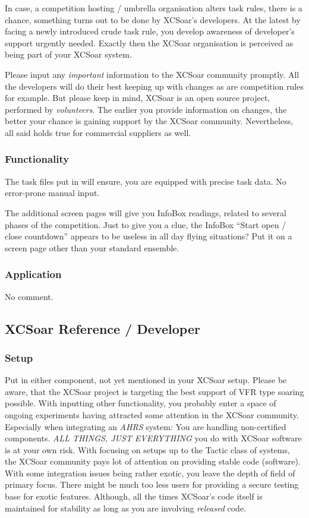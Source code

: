 In case, a competition hosting / umbrella organisation alters task rules, there 
is a chance, something turns out to be done by XCSoar's developers. At the latest 
by facing a newly introduced crude task rule, you develop awareness of 
developer's support urgently needed. Exactly then the XCSoar organisation is 
perceived as being part of your XCSoar system.

Please input any \emph{important} information to the XCSoar community promptly. 
All the developers will do their best keeping up with changes as are competition 
rules for example. But please keep in mind, XCSoar is an open source project, 
performed by \emph{volunteers}. The earlier you provide information on changes, 
the better your chance is gaining support by the XCSoar community. Nevertheless, 
all said holds true for commercial suppliers as well.  

\subsubsection*{Functionality} The task files put in will ensure, you are 
equipped with precise task data. No error-prone manual input.

The additional screen pages will give you InfoBox readings, related to several 
phases of the competition. Just to give you a clue, the InfoBox ``Start open /
close countdown'' appears to be useless in all day flying situations? Put it on a
screen page other than your standard ensemble.

\subsubsection*{Application}
No comment.

\subsection*{XCSoar Reference / Developer}
\subsubsection*{Setup} Put in either component, not yet mentioned in your XCSoar 
setup. Please be aware, that the XCSoar project is targeting the best support of 
VFR type soaring possible. With inputting other functionality, you probably enter 
a space of ongoing experiments having attracted some attention in the XCSoar 
community. Especially when integrating an \emph{AHRS} system: You are handling 
non-certified components. \tip \emph{ALL THINGS, JUST EVERYTHING} you do with 
XCSoar software is at your own risk. With focusing on setups up to the Tactic 
class of systems, the XCSoar community pays lot of attention on providing stable 
code (software). With some integration issues being rather exotic, you leave the 
depth of field of primary focus. There might be much too less users for providing 
a secure testing base for exotic features. Although, all the times XCSoar's code 
itself is maintained for stability as long as you are involving \emph{released} 
code.

